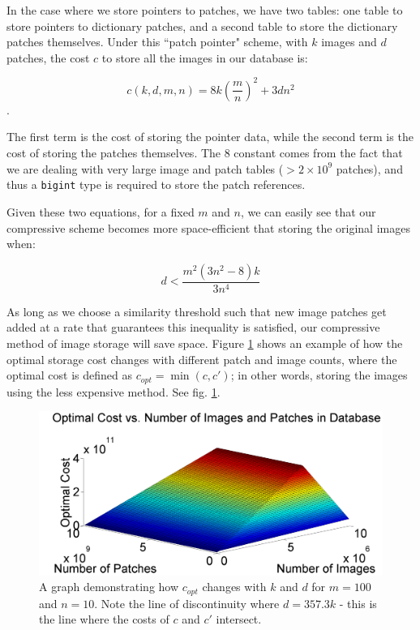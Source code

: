 \noindent In the case where we store pointers to patches, we have two tables: one table to store pointers to dictionary patches, and a second table to store the dictionary patches themselves.  Under this ``patch pointer" scheme, with $k$ images and $d$ patches, the cost $c$ to store all the images in our database is:

\begin{equation}
	c(k, d, m, n) = 8 k \left(\frac{m}{n}\right)^2 + 3  d  n^2
\end{equation}.

The first term is the cost of storing the pointer data, while the second term is the cost of storing the patches themselves.  The $8$ constant comes from the fact that we are dealing with very large image and patch tables ($ > 2 \times 10^9$ patches), and thus a \texttt{bigint} type is required to store the patch references.

Given these two equations, for a fixed $m$ and $n$, we can easily see that our compressive scheme becomes more space-efficient that storing the original images when:

\begin{equation}
	d < \frac{m^2 (3n^2 - 8) k}{3n^4}
\end{equation}

As long as we choose a similarity threshold such that new image patches get added at a rate that guarantees this inequality is satisfied, our compressive method of image storage will save space.  Figure \ref{fig:optcost} shows an example of how the optimal storage cost changes with different patch and image counts, where the optimal cost is defined as $c_{opt} = \min{(c, c')}$; in other words, storing the images using the less expensive method. See fig. \ref{fig:optcost}.

 \begin{figure}
\includegraphics[width=1\linewidth]{Figures/PatchCosts.png}
\caption{A graph demonstrating how $c_{opt}$ changes with $k$ and $d$ for $m=100$ and $n=10$.  Note the line of discontinuity where $d = 357.3 k$ - this is the line where the costs of $c$ and $c'$ intersect.}
\label{fig:optcost}
\end{figure}


